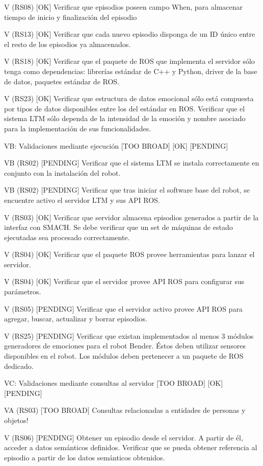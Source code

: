V (RS08) [OK]
Verificar que episodios poseen campo When, para almacenar tiempo de inicio y finalización del episodio

V (RS13) [OK]
Verificar que cada nuevo episodio disponga de un ID único entre el resto de los episodios ya almacenados.

V (RS18) [OK]
Verificar que el paquete de ROS que implementa el servidor sólo tenga como dependencias: librerías estándar de C++ y Python, driver de la base de datos, paquetes estándar de ROS.


V (RS23) [OK]
Verificar que estructura de datos emocional sólo está compuesta por tipos de datos disponibles entre los del estándar en ROS. Verificar que el sistema LTM sólo dependa de la intensidad de la emoción y nombre asociado para la implementación de sus funcionalidades.

VB: Validaciones mediante ejecución
[TOO BROAD]
[OK]
[PENDING]

VB (RS02) [PENDING]
Verificar que el sistema LTM se instala correctamente en conjunto con la instalación del robot.

VB (RS02) [PENDING]
Verificar que tras iniciar el software base del robot, se encuentre activo el servidor LTM y sus API ROS.

V (RS03) [OK]
Verificar que servidor almacena episodios generados a partir de la interfaz con SMACH. Se debe verificar que un set de máquinas de estado ejecutadas sea procesado correctamente.

V (RS04) [OK]
Verificar que el paquete ROS provee herramientas para lanzar el servidor.

V (RS04) [OK]
Verificar que el servidor provee API ROS para configurar sus parámetros.

V (RS05) [PENDING]
Verificar que el servidor activo provee API ROS para agregar, buscar, actualizar y borrar episodios. 

V (RS25) [PENDING]
Verificar que existan implementados al menos 3 módulos generadores de emociones para el robot Bender. Éstos deben utilizar sensores disponibles en el robot. Los módulos deben pertenecer a un paquete de ROS dedicado.

VC: Validaciones mediante consultas al servidor
[TOO BROAD]
[OK]
[PENDING]

VA (RS03) [TOO BROAD]
Consultas relacionadas a entidades de personas y objetos!

V (RS06) [PENDING]
Obtener un episodio desde el servidor. A partir de él, acceder a datos semánticos definidos. Verificar que se pueda obtener referencia al episodio a partir de los datos semánticos obtenidos.

